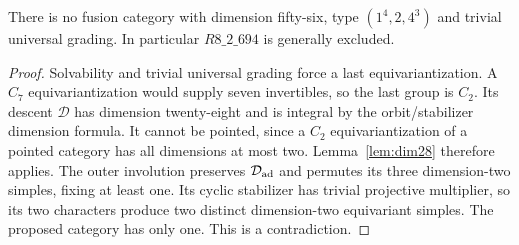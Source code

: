 \begin{proposition}\label{prop:dim56}
There is no fusion category with dimension fifty-six, type
$(1^4,2,4^3)$ and trivial universal grading. In particular
$R8\_2\_694$ is generally excluded.
\end{proposition}
\begin{proof}
Solvability and trivial universal grading force a last equivariantization.
A $C_7$ equivariantization would supply seven invertibles, so the last
group is $C_2$. Its descent $\mathcal D$ has dimension twenty-eight
and is integral by the orbit/stabilizer dimension formula. It cannot
be pointed, since a $C_2$ equivariantization of a pointed category has
all dimensions at most two. Lemma~\ref{lem:dim28} therefore applies.
The outer involution preserves $\mathcal D_{\rm ad}$ and permutes
its three dimension-two simples, fixing at least one. Its cyclic
stabilizer has trivial projective multiplier, so its two characters
produce two distinct dimension-two equivariant simples. The proposed
category has only one. This is a contradiction.
\end{proof}
